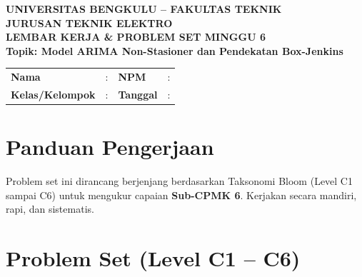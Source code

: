\documentclass[11pt,a4paper]{article}
\begin{document}
\begin{center}
    {\large \textbf{\color{primaryblue}UNIVERSITAS BENGKULU -- FAKULTAS TEKNIK}}\\[0.1cm]
    {\large \textbf{\color{secondaryblue}JURUSAN TEKNIK ELEKTRO}}\\[0.25cm]
    {\LARGE \textbf{\color{primaryblue}LEMBAR KERJA \& PROBLEM SET MINGGU 6}}\\[0.1cm]
    {\normalsize \textbf{Topik: Model ARIMA Non-Stasioner dan Pendekatan Box-Jenkins}}
\end{center}

\vspace{0.2cm}

\begin{tcolorbox}[colback=boxbg,colframe=primaryblue,arc=2mm,title=\textbf{Identitas Mahasiswa}]
\small
\begin{tabular}{p{2.5cm}p{5.5cm}p{2.5cm}p{4.5cm}}
\textbf{Nama} & : \dotfill & \textbf{NPM} & : \dotfill \\
\textbf{Kelas/Kelompok} & : \dotfill & \textbf{Tanggal} & : \dotfill \\
\end{tabular}
\end{tcolorbox}

\vspace{0.2cm}

\section{Panduan Pengerjaan}
Problem set ini dirancang berjenjang berdasarkan Taksonomi Bloom (Level C1 sampai C6) untuk mengukur capaian \textbf{Sub-CPMK 6}. Kerjakan secara mandiri, rapi, dan sistematis.

\section{Problem Set (Level C1 -- C6)}
\end{document}
